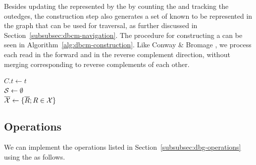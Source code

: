 Besides updating the \dBG represented by the \dBCM by counting the  and tracking the outedges, the construction step also generates a set of  known to be represented in the graph that can be used for traversal, as further discussed in Section~\ref{subsubsec:dbcm-navigation}. The procedure for constructing a \dBCM can be seen in Algorithm~\ref{alg:dbcm-construction}. Like Conway \& Bromage \cite{Conway2011}, we process each read in the forward and in the reverse complement direction, without merging  corresponding to reverse complements of each other.

\begin{algorithm}
	\caption{$C.\mathit{construct}(\readset, t, n)$}\label{alg:dbcm-construction}
  $C.t \gets t$\\
  $\strsetname{S} \gets \emptyset$\\
  $\overline{\readset} \gets \{\overline{R}; R \in \readset \}$\\
\end{algorithm}

\subsection{\dBCM Operations}
\label{subsubsec:dbcm-operations}

We can implement the operations listed in Section~\ref{subsubsec:dbg-operations} using the \dBCM as follows.

